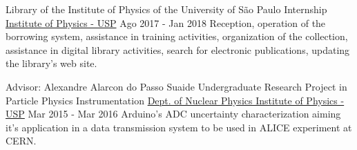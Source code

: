 \begin{cventries}
\cventry
{Library of the Institute of Physics of the University of São Paulo} %
{Internship} %
{\href{http://portal.if.usp.br/ifusp/en}{Institute of Physics - USP}} %
{Ago 2017 - Jan 2018} %
{ %
Reception, operation of the borrowing system, assistance in training activities, organization of the collection, assistance in digital library activities, search for electronic publications, updating the library's web site.\newline}


\cventry
{
Advisor: Alexandre Alarcon do Passo Suaide} %
{Undergraduate Research Project in Particle Physics Instrumentation} %
{\href{http://portal.if.usp.br/fnc/en}{Dept. of Nuclear Physics \newline Institute of Physics - USP}}
{Mar 2015 - Mar 2016} %
{ %
Arduino's ADC uncertainty characterization aiming it's application in a data transmission system to be used in ALICE  experiment at CERN.\newline}



\end{cventries}
